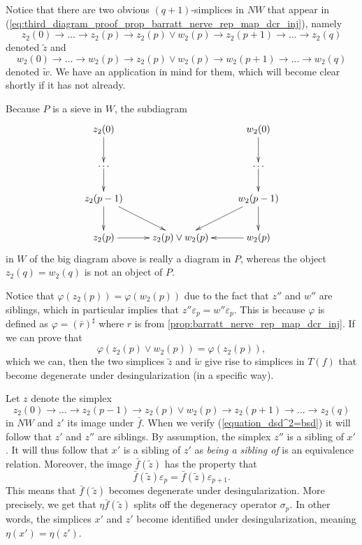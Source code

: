 Notice that there are two obvious $(q+1)$-simplices in $NW$ that appear in (\ref{eq:third_diagram_proof_prop_barratt_nerve_rep_map_dcr_inj}), namely
\[z_2(0)\to \dots \to z_2(p)\to z_2(p)\vee w_2(p)\to z_2(p+1)\to \dots \to z_2(q)\]
denoted $\tilde{z}$ and
\[w_2(0)\to \dots \to w_2(p)\to z_2(p)\vee w_2(p)\to w_2(p+1)\to \dots \to w_2(q)\]
denoted $\tilde{w}$. We have an application in mind for them, which will become clear shortly if it has not already.

Because $P$ is a sieve in $W$, the subdiagram
\begin{displaymath}
\xymatrix{
z_2(0) \ar[d] && w_2(0) \ar[d] \\
\dots \ar[d] && \dots \ar[d] \\
z_2(p-1) \ar[d] \ar[dr] && w_2(p-1) \ar[ld] \ar[d] \\
z_2(p) \ar[r] & z_2(p)\vee w_2(p) & w_2(p) \ar[l] \\
}
\end{displaymath}
in $W$ of the big diagram above is really a diagram in $P$, whereas the object $z_2(q)=w_2(q)$ is not an object of $P$.

Notice that $\varphi (z_2(p))=\varphi (w_2(p))$ due to the fact that $z''$ and $w''$ are siblings, which in particular implies that $z''\varepsilon _p=w''\varepsilon _p$. This is because $\varphi$ is defined as $\varphi =(\bar{r} )^\sharp$ where $r$ is from \cref{prop:barratt_nerve_rep_map_dcr_inj}. If we can prove that
\begin{equation}\label{equation_dsd^2=bsd}
\varphi (z_2(p)\vee w_2(p))=\varphi (z_2(p)),
\end{equation}
which we can, then the two simplices $\tilde{z}$ and $\tilde{w}$ give rise to simplices in $T(f)$ that become degenerate under desingularization (in a specific way).

Let $z$ denote the simplex
\[z_2(0)\to \dots \to z_2(p-1)\to z_2(p)\vee w_2(p)\to z_2(p+1)\to \dots \to z_2(q)\]
in $NW$ and $z'$ its image under $\bar{f}$. When we verify (\ref{equation_dsd^2=bsd}) it will follow that $z'$ and $z''$ are siblings. By assumption, the simplex $z''$ is a sibling of $x'$. It will thus follow that $x'$ is a sibling of $z'$ as \emph{being a sibling of} is an equivalence relation. Moreover, the image $\bar{f} (\tilde{z} )$ has the property that
\[\bar{f} (\tilde{z} )\varepsilon _p=\bar{f} (\tilde{z} )\varepsilon _{p+1}.\]
This means that $\bar{f} (\tilde{z} )$ becomes degenerate under desingularization. More precisely, we get that $\eta \bar{f} (\tilde{z} )$ splits off the degeneracy operator $\sigma _p$. In other words, the simplices $x'$ and $z'$ become identified under desingularization, meaning $\eta (x')=\eta (z')$.

